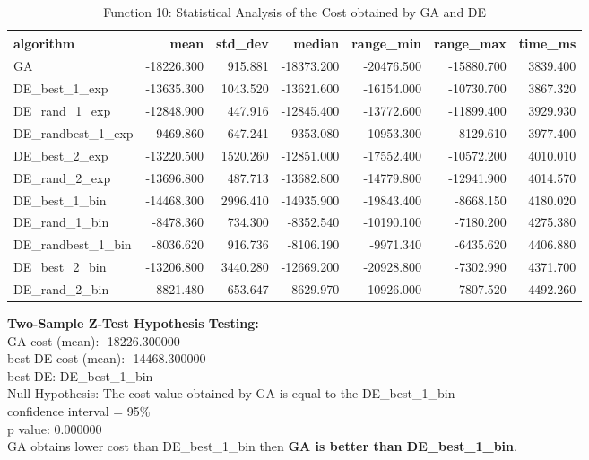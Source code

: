 \documentclass[12pt]{article}
\begin{document}
\begin{table}[H]
    \centering
    \footnotesize
    
\begin{tabular}{lrrrrrr}
    \toprule
    algorithm &       mean &  std\_dev &     median &  range\_min &  range\_max &  time\_ms \\
    \midrule
    GA & -18226.300 &  915.881 & -18373.200 & -20476.500 & -15880.700 & 3839.400 \\
    DE\_best\_1\_exp & -13635.300 & 1043.520 & -13621.600 & -16154.000 & -10730.700 & 3867.320 \\
    DE\_rand\_1\_exp & -12848.900 &  447.916 & -12845.400 & -13772.600 & -11899.400 & 3929.930 \\
    DE\_randbest\_1\_exp &  -9469.860 &  647.241 &  -9353.080 & -10953.300 &  -8129.610 & 3977.400 \\
    DE\_best\_2\_exp & -13220.500 & 1520.260 & -12851.000 & -17552.400 & -10572.200 & 4010.010 \\
    DE\_rand\_2\_exp & -13696.800 &  487.713 & -13682.800 & -14779.800 & -12941.900 & 4014.570 \\
    DE\_best\_1\_bin & -14468.300 & 2996.410 & -14935.900 & -19843.400 &  -8668.150 & 4180.020 \\
    DE\_rand\_1\_bin &  -8478.360 &  734.300 &  -8352.540 & -10190.100 &  -7180.200 & 4275.380 \\
    DE\_randbest\_1\_bin &  -8036.620 &  916.736 &  -8106.190 &  -9971.340 &  -6435.620 & 4406.880 \\
    DE\_best\_2\_bin & -13206.800 & 3440.280 & -12669.200 & -20928.800 &  -7302.990 & 4371.700 \\
    DE\_rand\_2\_bin &  -8821.480 &  653.647 &  -8629.970 & -10926.000 &  -7807.520 & 4492.260 \\
    \bottomrule
\end{tabular}
    
    \caption{Function 10: Statistical Analysis of the Cost obtained by GA and DE} 
\end{table}
\noindent
\textbf{Two-Sample Z-Test Hypothesis Testing:}\\
GA cost (mean): -18226.300000\\
best DE cost (mean): -14468.300000\\
best DE: DE\_best\_1\_bin\\
Null Hypothesis: The cost value obtained by GA is equal to the DE\_best\_1\_bin\\
confidence interval = 95\%\\
p value: 0.000000\\
GA obtains lower cost than DE\_best\_1\_bin then \textbf{GA is better than DE\_best\_1\_bin}.\\
\end{document}
